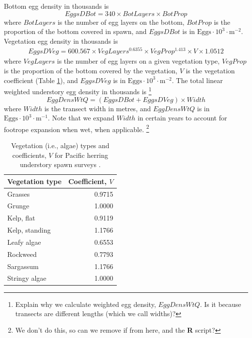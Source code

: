 \documentclass[12pt]{article}
\begin{document}
Bottom egg density in thousands is \citep{HaegeleEtal1979}
\begin{equation}
EggsDBot = 340 \times BotLayers \times BotProp
\label{eqEggDensUnderB}
\end{equation}
where $BotLayers$ is the number of egg layers on the bottom, $BotProp$ is the proportion of the bottom covered in spawn, and $EggsDBot$ is in $\text{Eggs} \cdot 10^{3} \cdot \text{m}^{-2}$.
Vegetation egg density in thousands is \citep{Schweigert2005}
\begin{multline}
EggsDVeg = 600.567 \times VegLayers^{0.6355} \times VegProp^{1.413} \times V \times 1.0512
\label{eqEggDensUnderV}
\end{multline}
where $VegLayers$ is the number of egg layers on a given vegetation type, $VegProp$ is the proportion of the bottom covered by the vegetation, $V$ is the vegetation coefficient (Table \ref{tabVegTypes}), and $EggsDVeg$ is in $\text{Eggs} \cdot 10^{3} \cdot \text{m}^{-2}$.
The total linear weighted understory egg density in thousands is%
\footnote{Explain why we calculate weighted egg density, $EggDensWtQ$.
Is it because transects are different lengths (which we call widths)?}
\begin{equation}
EggDensWtQ = \left( EggsDBot + EggsDVeg \right) \times Width
\label{eqEggDensWtUnder}
\end{equation}
where $Width$ is the transect width in metres, and $EggDensWtQ$ is in $\text{Eggs} \cdot 10^{3} \cdot \text{m}^{-1}$.
Note that we expand $Width$ in certain years to account for footrope expansion when wet, when applicable.%
\footnote{We don't do this, so can we remove if from here, and the \textbf{R} script?}

\begin{table}
\centering
\caption[Vegetation (i.e., algae) types and coefficients for Pacific herring understory spawn surveys]
{Vegetation (i.e., algae) types and coefficients, $V$ for Pacific herring understory spawn surveys \citep{Schweigert2005}.}
\begin{tabular}{lr}
\toprule
Vegetation type & Coefficient, $V$\\
\midrule
Grasses & 0.9715 \\
Grunge & 1.0000 \\
Kelp, flat & 0.9119 \\
Kelp, standing & 1.1766 \\
Leafy algae & 0.6553 \\
Rockweed & 0.7793 \\
Sargassum & 1.1766 \\
Stringy algae & 1.0000 \\
\bottomrule
\end{tabular}
\label{tabVegTypes}
\end{table}
\end{document}
